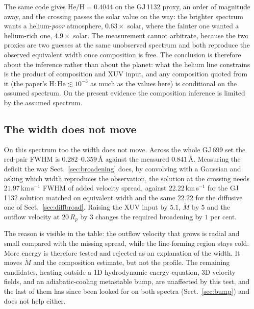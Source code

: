 \documentclass[english,a4paper]{my_memo}
\begin{document}
The same code gives $\mathrm{He/H} = 0.4044$ on the GJ\,1132 proxy, an order
of magnitude away, and the crossing passes the solar value on the way: the
brighter spectrum wants a helium-\emph{poor} atmosphere, $0.63\times$ solar,
where the fainter one wanted a helium-rich one, $4.9\times$ solar. The
measurement cannot arbitrate, because the two proxies are two guesses at the
same unobserved spectrum and both reproduce the observed equivalent width
once composition is free. The conclusion is therefore about the inference
rather than about the planet: what the helium line constrains is the product
of composition and XUV input, and any composition quoted from it (the paper's
$\mathrm{H\!:\!He} \lesssim 10^{-3}$ as much as the values here) is
conditional on the assumed spectrum. On the present evidence the composition
inference is limited by the assumed spectrum.

\subsection{The width does not move}

On this spectrum too the width does not move. Across the whole GJ\,699 set
the red-pair FWHM is $0.282$--$0.359$\,\AA{} against the measured
$0.841$\,\AA. Measuring the deficit the way Sect.~\ref{sec:broadening} does,
by convolving with a Gaussian and asking which width reproduces the
observation, the solution at the crossing needs $21.97$\,km\,s$^{-1}$ FWHM of
added velocity spread, against $22.22$\,km\,s$^{-1}$ for the GJ\,1132
solution matched on equivalent width and the same $22.22$ for the diffusive
one of Sect.~\ref{sec:diffbroad}. Raising the XUV input by $5.1$, $\dot M$ by
$5$ and the outflow velocity at $20\,R_p$ by $3$ changes the required
broadening by $1$ per cent.

The reason is visible in the table: the outflow velocity that grows is radial
and small compared with the missing spread, while the line-forming region
stays cold. More energy is therefore tested and rejected as an explanation of
the width. It moves $\dot M$ and the composition estimate, but not the
profile. The remaining candidates, heating outside a 1D hydrodynamic energy
equation, 3D velocity fields, and an adiabatic-cooling metastable bump, are
unaffected by this test, and the last of them has since been looked for on
both spectra (Sect.~\ref{sec:bump}) and does not help either.
\end{document}
